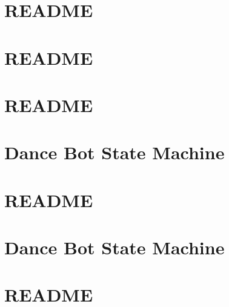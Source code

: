 \documentclass[twoside]{book}
\newcommand{\+}{\discretionary{\mbox{\scriptsize$\hookleftarrow$}}{}{}}
\begin{document}
\chapter{R\+E\+A\+D\+ME}
\label{md_smacc_sm_reference_library_sm_respira_1_README}

\chapter{R\+E\+A\+D\+ME}
\label{md_smacc_sm_reference_library_sm_ridgeback_barrel_search_1_README}

\chapter{R\+E\+A\+D\+ME}
\label{md_smacc_sm_reference_library_sm_ridgeback_barrel_search_2_README}

\chapter{Dance Bot State Machine}
\label{md_smacc_sm_reference_library_sm_ridgeback_floor_coverage_dynamic_1_launch_readme}

\chapter{R\+E\+A\+D\+ME}
\label{md_smacc_sm_reference_library_sm_ridgeback_floor_coverage_dynamic_1_README}

\chapter{Dance Bot State Machine}
\label{md_smacc_sm_reference_library_sm_ridgeback_floor_coverage_static_1_launch_readme}

\chapter{R\+E\+A\+D\+ME}
\label{md_smacc_sm_reference_library_sm_ridgeback_floor_coverage_static_1_README}

\end{document}
